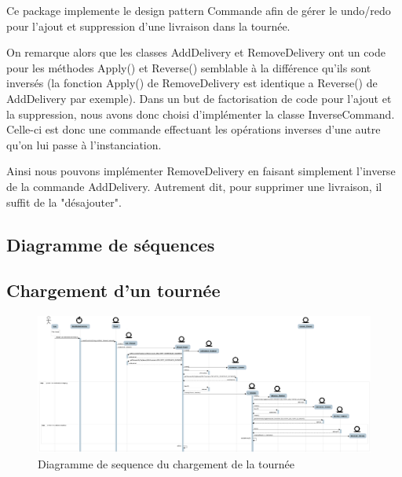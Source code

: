 Ce package implemente le design pattern Commande afin de g\'erer le undo/redo pour l'ajout et
suppression d'une livraison dans la tourn\'ee.

On remarque alors que les classes AddDelivery et
RemoveDelivery ont un code pour les m\'ethodes Apply() et Reverse() semblable \`a la diff\'erence
qu'ils sont invers\'es (la fonction Apply() de RemoveDelivery est identique a Reverse() de
AddDelivery par exemple). Dans un but de factorisation de code pour l'ajout
et la suppression, nous avons donc choisi d'impl\'ementer la classe InverseCommand. Celle-ci est donc une
commande effectuant les op\'erations inverses d'une autre qu'on lui passe \`a l'instanciation.

Ainsi nous pouvons impl\'ementer RemoveDelivery en faisant simplement l'inverse de la commande
AddDelivery. Autrement dit, pour supprimer une livraison, il suffit de la "d\'esajouter".



\begin{landscape}
    \section{Diagramme de s\'equences}

    \subsection{Chargement d'un tourn\'ee}

    \begin{figure}[h]
        \centering
        \includegraphics[width=240mm]{../diagrams/sequences/loadRound.png}
        \caption{Diagramme de sequence du chargement de la tourn\'ee}
        \label{diagram:seq_load_round}
    \end{figure}
\end{landscape}
\pagebreak


